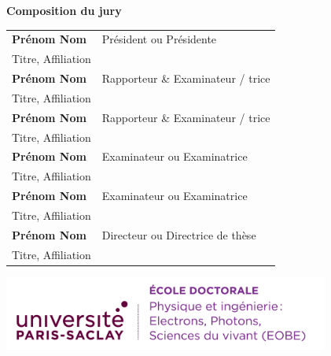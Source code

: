 \documentclass[12pt,a4paper]{book}
\begin{document}
\begin{titlepage}
        \flushleft
        \small \textbf{Composition du jury}\\
        \vspace{2mm}
        \scriptsize
        \begin{tabular}{|p{7cm}l}
            \arrayrulecolor{Prune}
            \textbf{Prénom Nom} & Président ou Présidente           \\
            Titre, Affiliation  &                                   \\
            \textbf{Prénom Nom} & Rapporteur \& Examinateur / trice \\
            Titre, Affiliation  &                                   \\
            \textbf{Prénom Nom} & Rapporteur \& Examinateur / trice \\
            Titre, Affiliation  &                                   \\
            \textbf{Prénom Nom} & Examinateur ou Examinatrice       \\
            Titre, Affiliation  &                                   \\
            \textbf{Prénom Nom} & Examinateur ou Examinatrice       \\
            Titre, Affiliation  &                                   \\
            \textbf{Prénom Nom} & Directeur ou Directrice de thèse  \\
            Titre, Affiliation  &                                   \\

        \end{tabular}

    \end{titlepage}

    \Ifthispageodd{\newpage\thispagestyle{empty}\null\newpage}{}
    \thispagestyle{empty}
    \selectfont

    \lhead{}
    \rhead{}
    \rfoot{}
    \cfoot{}
    \lfoot{}

    \noindent
    \includegraphics[height=2.45cm]{static/logos/EOBE}
    \vspace{1cm}
    \selectfont
\end{document}
